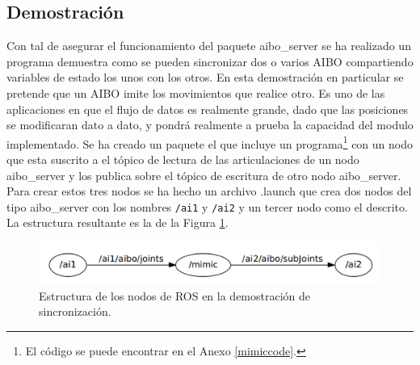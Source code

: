 \documentclass[12pt,a4paper,final,twoside]{book}
\begin{document}
\subsection{Demostración}
Con tal de asegurar el funcionamiento del paquete aibo{\_}server se ha realizado un programa demuestra como se pueden sincronizar dos o varios AIBO compartiendo variables de estado los unos con los otros. 
En esta demostración en particular se pretende que un AIBO imite los movimientos que realice otro. Es uno de las aplicaciones en que el flujo de datos es realmente grande, dado que las posiciones se modificaran dato a dato, y pondrá realmente a prueba la capacidad del modulo implementado.
Se ha creado un paquete el que incluye un programa\footnote{El código se puede encontrar en el Anexo \ref{mimiccode}.} con un nodo que esta suscrito a el tópico de lectura de las articulaciones de un nodo aibo{\_}server y los publica sobre el tópico de escritura de otro nodo aibo{\_}server. Para crear estos tres nodos se ha hecho un archivo .launch que crea dos nodos del tipo aibo{\_}server con los nombres \texttt{/ai1} y \texttt{/ai2} y un tercer nodo como el descrito. La estructura resultante es la de la Figura \ref{fig:mimic}.


\begin{figure}[H]
	\centering
    \includegraphics[scale=0.75]{images/mimic.pdf}
	 \caption{Estructura de los nodos de ROS en la demostración de sincronización.}
  \label{fig:mimic}
\end{figure}
\end{document}
